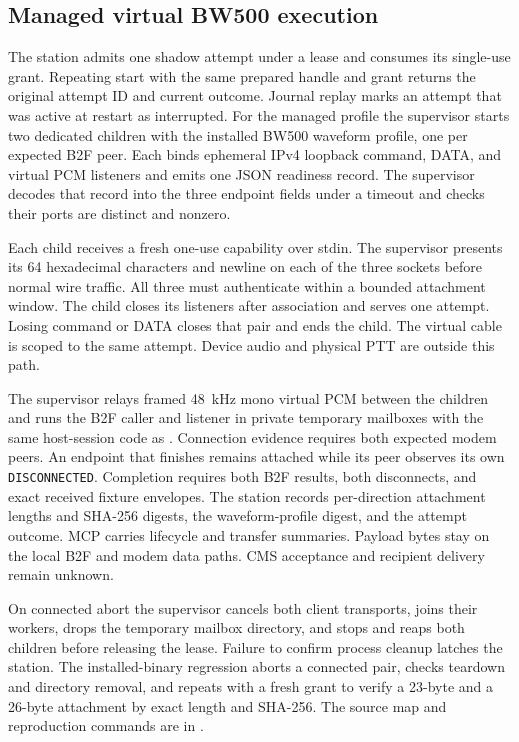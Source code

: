 \subsection{Managed virtual BW500 execution}
\label{sec:managed-bw500}
The station admits one shadow attempt under a lease and consumes its
single-use grant. Repeating start with the same prepared handle and grant
returns the original attempt ID and current outcome. Journal replay marks
an attempt that was active at restart as interrupted. For the managed
profile the supervisor starts two
dedicated  children with the installed BW500 waveform
profile, one per expected B2F peer. Each binds ephemeral IPv4 loopback
command, DATA, and virtual PCM listeners and emits one JSON readiness
record. The supervisor decodes that record into the three endpoint fields
under a timeout and checks their ports are distinct and nonzero.

Each child receives a fresh one-use capability over stdin. The supervisor
presents its 64 hexadecimal characters and newline on each of the three
sockets before normal wire traffic. All three must authenticate within a
bounded attachment window. The child closes its listeners after association
and serves one attempt. Losing command or DATA closes that pair and ends the
child. The virtual cable is scoped to the same attempt. Device audio and
physical PTT are outside this path.

The supervisor relays framed 48~kHz mono virtual PCM between the children
and runs the B2F caller and listener in private temporary mailboxes with
the same host-session code as . Connection evidence
requires both expected modem peers. An endpoint that finishes remains
attached while its peer observes its own \texttt{DISCONNECTED}. Completion
requires both B2F results, both disconnects, and exact received fixture
envelopes. The station records per-direction attachment lengths and
SHA-256 digests, the waveform-profile digest, and the attempt outcome.
MCP carries lifecycle and transfer summaries. Payload bytes stay on the
local B2F and modem data paths. CMS acceptance and recipient delivery
remain unknown.

On connected abort the supervisor cancels both client transports, joins
their workers, drops the temporary mailbox directory, and stops and reaps
both children before releasing the lease. Failure to confirm process cleanup
latches the station. The installed-binary regression aborts a connected
pair, checks teardown and directory removal, and repeats with a fresh grant
to verify a 23-byte and a 26-byte attachment by exact length and SHA-256.
The source map and reproduction commands are in
.

